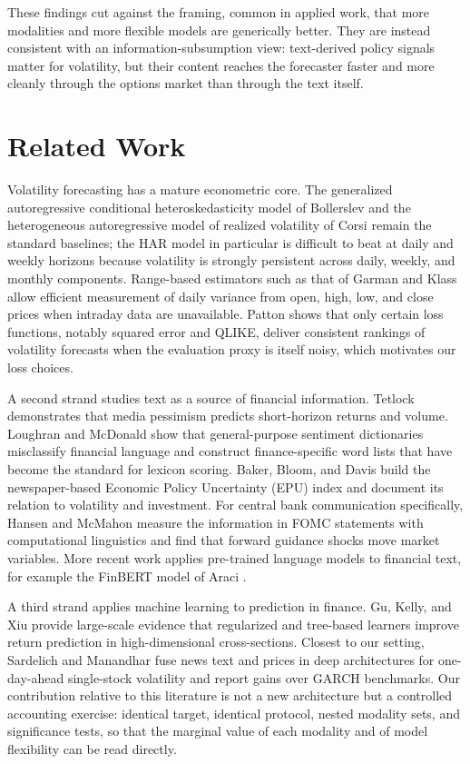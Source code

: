 \documentclass[10pt,twocolumn]{article}
\begin{document}
These findings cut against the framing, common in applied work, that more modalities and more flexible models are generically better. They are instead consistent with an information-subsumption view: text-derived policy signals matter for volatility, but their content reaches the forecaster faster and more cleanly through the options market than through the text itself.

\section{Related Work}
Volatility forecasting has a mature econometric core. The generalized autoregressive conditional heteroskedasticity model of Bollerslev \cite{bollerslev1986} and the heterogeneous autoregressive model of realized volatility of Corsi \cite{corsi2009} remain the standard baselines; the HAR model in particular is difficult to beat at daily and weekly horizons because volatility is strongly persistent across daily, weekly, and monthly components. Range-based estimators such as that of Garman and Klass \cite{garman1980} allow efficient measurement of daily variance from open, high, low, and close prices when intraday data are unavailable. Patton \cite{patton2011} shows that only certain loss functions, notably squared error and QLIKE, deliver consistent rankings of volatility forecasts when the evaluation proxy is itself noisy, which motivates our loss choices.

A second strand studies text as a source of financial information. Tetlock \cite{tetlock2007} demonstrates that media pessimism predicts short-horizon returns and volume. Loughran and McDonald \cite{loughran2011} show that general-purpose sentiment dictionaries misclassify financial language and construct finance-specific word lists that have become the standard for lexicon scoring. Baker, Bloom, and Davis \cite{baker2016} build the newspaper-based Economic Policy Uncertainty (EPU) index and document its relation to volatility and investment. For central bank communication specifically, Hansen and McMahon \cite{hansen2016} measure the information in FOMC statements with computational linguistics and find that forward guidance shocks move market variables. More recent work applies pre-trained language models to financial text, for example the FinBERT model of Araci \cite{araci2019}.

A third strand applies machine learning to prediction in finance. Gu, Kelly, and Xiu \cite{gu2020} provide large-scale evidence that regularized and tree-based learners \cite{breiman2001,friedman2001} improve return prediction in high-dimensional cross-sections. Closest to our setting, Sardelich and Manandhar \cite{sardelich2018} fuse news text and prices in deep architectures for one-day-ahead single-stock volatility and report gains over GARCH benchmarks. Our contribution relative to this literature is not a new architecture but a controlled accounting exercise: identical target, identical protocol, nested modality sets, and significance tests, so that the marginal value of each modality and of model flexibility can be read directly.
\end{document}
